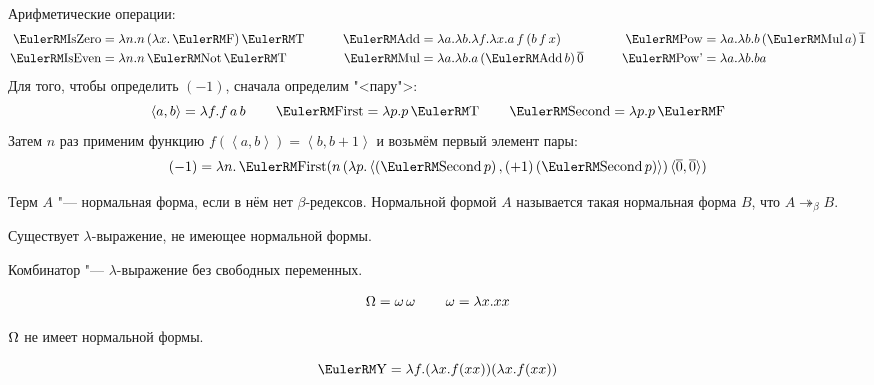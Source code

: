 Арифметические операции:
\begin{align*}
    \comb{IsZero} &= \lambda{}n.n\mathinner{(\lambda{}x.\F)}\T &\qquad
    \comb{Add}    &= \lambda{}a.\lambda{}b.\lambda{}f.\lambda{}x.a \mathinner{f} (b \mathinner{f} x) &\qquad
    \comb{Pow}    &= \lambda{}a.\lambda{}b.b \mathinner{(\comb{Mul} a)} \mathinner{\overline{1}} \\
    \comb{IsEven} &= \lambda{}n.n \Not \T &\qquad
    \comb{Mul}    &= \lambda{}a.\lambda{}b.a \mathinner{(\comb{Add} b)} \mathinner{\overline{0}} &\qquad
    \comb{Pow'}   &= \lambda{}a.\lambda{}b.b a
\end{align*}
Для того, чтобы определить $(-1)$, сначала определим "<пару">:
\[
    \left<a,b\right> = \lambda f.f \mathinner{a} b \qquad
    \comb{First} = \lambda p . p \T \qquad
    \comb{Second} = \lambda p . p \F
\]%
Затем $n$ раз применим функцию $f\left(\left<a,b\right>\right) = \left<b,b+1\right>$ и возьмём первый элемент пары:
\[
    (-1) = \lambda n . \comb{First}
        (n \mathinner{(\lambda p . \left<\left(\comb{Second} p\right), \mathinner{(+1)} (\comb{Second} p)\right>)}
        \langle\overline{0},\overline{0}\rangle)
\]

\begin{definition}
    Терм $A$ "--- нормальная форма, если в нём нет $\beta$-редексов.
    Нормальной формой $A$ называется такая нормальная форма $B$, что $A \twoheadrightarrow_{\beta} B$.
\end{definition}

\begin{statement}
    Существует $\lambda$-выражение, не имеющее нормальной формы.
\end{statement}

\begin{definition}[комбинатор]
    Комбинатор "--- $\lambda$-выражение без свободных переменных.
\end{definition}

\begin{definition}
\[
    \operatorname{\Omega} = \operatorname{\omega} \operatorname{\omega} \qquad
    \operatorname{\omega} = \lambda x . x x
\]
\end{definition}

$\operatorname{\Omega}$ не имеет нормальной формы.

\begin{definition}
    \[
        \comb Y = \lambda f . (\lambda x . f (x x)) (\lambda x . f (x x))
    \]
\end{definition}

